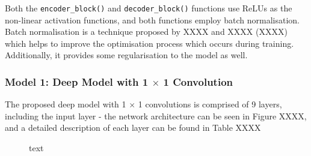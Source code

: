 \documentclass[a4paper]{article}
\begin{document}
Both the \verb|encoder_block()| and \verb|decoder_block()| functions use ReLUs as the non-linear activation functions, and both functions employ batch normalisation. Batch normalisation is a technique proposed by XXXX and XXXX (XXXX) which helps to improve the optimisation process which occurs during training. Additionally, it provides some regularisation to the model as well.

\clearpage

\subsubsection{Model 1: Deep Model with 1 $\times$ 1 Convolution}
The proposed deep model with 1 $\times$ 1 convolutions is comprised of 9 layers, including the input layer - the network architecture can be seen in Figure XXXX, and a detailed description of each layer can be found in Table XXXX
\begin{figure}[h]
\centering
{}
\caption{text}
\end{figure}
\end{document}
